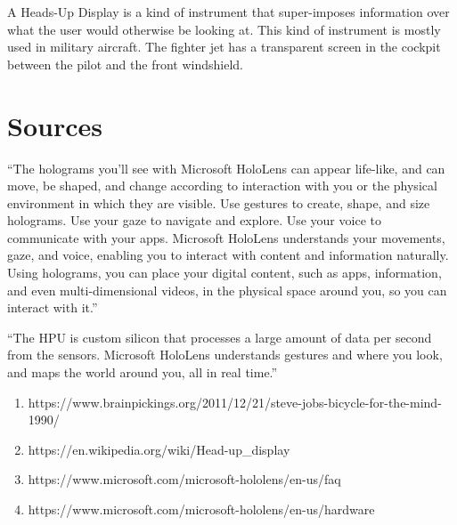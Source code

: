 \documentclass[a4paper,12pt]{article}
\begin{document}
A Heads-Up Display is a kind of instrument that super-imposes information over what the user would otherwise be looking at. This kind of instrument is mostly used in military aircraft. The fighter jet has a transparent screen in the cockpit between the pilot and the front windshield. 

\section{Sources}

``The holograms you’ll see with Microsoft HoloLens can appear life-like, and can move, be shaped, and change according to interaction with you or the physical environment in which they are visible. Use gestures to create, shape, and size holograms. Use your gaze to navigate and explore. Use your voice to communicate with your apps. Microsoft HoloLens understands your movements, gaze, and voice, enabling you to interact with content and information naturally. Using holograms, you can place your digital content, such as apps, information, and even multi-dimensional videos, in the physical space around you, so you can interact with it.''

``The HPU is custom silicon that processes a large amount of data per second from the sensors. Microsoft HoloLens understands gestures and where you look, and maps the world around you, all in real time.''
\begin{enumerate}
    \item https://www.brainpickings.org/2011/12/21/steve-jobs-bicycle-for-the-mind-1990/
    \item https://en.wikipedia.org/wiki/Head-up\_display
	\item https://www.microsoft.com/microsoft-hololens/en-us/faq
	\item https://www.microsoft.com/microsoft-hololens/en-us/hardware
\end{enumerate}
\end{document}
